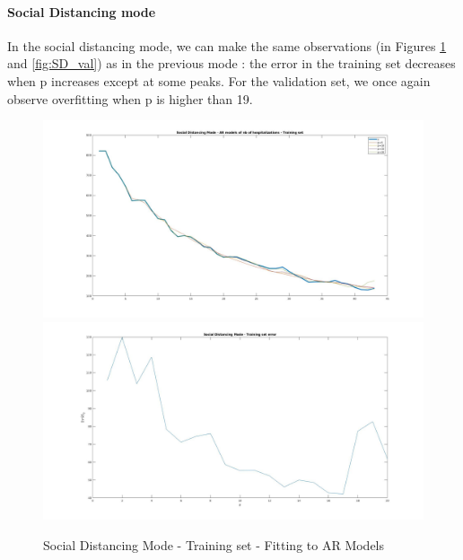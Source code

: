 \documentclass[11pt]{article}
\begin{document}
\newpage

\paragraph{Social Distancing mode}

In the social distancing mode, we can make the same observations (in Figures \ref{fig:SD_train} and \ref{fig:SD_val}) as in the previous mode : the error in the training set decreases when p increases except at some peaks.
For the validation set, we once again observe overfitting when p is higher than 19.
\begin{figure}[h!]
\centering
\includegraphics[scale=0.3]{SD_train.jpg}
\includegraphics[scale=0.3]{SD_Err_Train.jpg}
\caption{Social Distancing Mode - Training set - Fitting to AR Models}
\label{fig:SD_train}
\end{figure}
\end{document}

